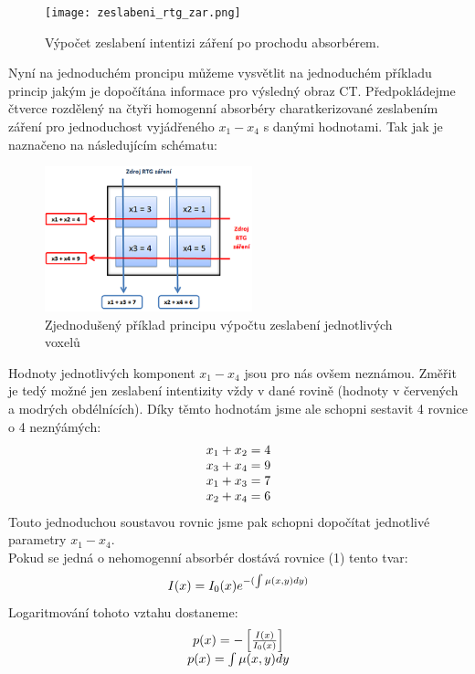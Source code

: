 \documentclass{thesis}%
\begin{document}
\begin{figure}[h!]
 \centering
	\texttt{[image: zeslabeni\_rtg\_zar.png]}
	\caption[Výpočet absorbce]{Výpočet zeslabení intentizi záření po prochodu absorbérem.}
\end{figure}
Nyní na jednoduchém proncipu můžeme vysvětlit na jednoduchém příkladu princip jakým je dopočítána informace pro výsledný obraz CT. Předpokládejme čtverce rozdělený na čtyři homogenní absorbéry charatkerizované zeslabením záření pro jednoduchost vyjádřeného $x_{1} - x_{4} $ s danými hodnotami. Tak jak je naznačeno na následujícím schématu:
\begin{figure}[h!]
 \centering
	\includegraphics[width=6cm]{princip_CT.png}
	\caption[Princip výpočtu zeslabení voxelů]{Zjednodušený příklad principu výpočtu zeslabení jednotlivých voxelů}
\end{figure}
Hodnoty jednotlivých komponent $x_{1} - x_{4}$ jsou pro nás ovšem neznámou. Změřit je tedý možné jen zeslabení intentizity vždy v dané rovině (hodnoty v červených a modrých obdélnících). Díky těmto hodnotám jsme ale schopni sestavit 4 rovnice o 4 neznýámých:
\begin{equation}
 \centering
\begin{array}[h]{c}
	x_{1} + x_{2} = 4 \\
	x_{3} + x_{4} = 9 \\
	x_{1} + x_{3} = 7 \\
	x_{2} + x_{4} = 6
\end{array}
\end{equation}
Touto jednoduchou soustavou rovnic jsme pak schopni dopočítat jednotlivé parametry $x_{1} - x_{4}$. \\
Pokud se jedná o nehomogenní absorbér dostává rovnice (1) tento tvar:
\begin{equation}
 \centering
	I(x) = I_{0}(x)e^{-(\int\mu(x,y) dy) }
\end{equation}
Logaritmování tohoto vztahu dostaneme:
\begin{equation}
 \centering
\begin{array}[h!]{c}
	p(x) = -\left[\frac{I(x)}{I_{0}(x)}\right] \\
	p(x) = \int\mu (x,y) dy
\end{array}
\end{equation}
\end{document}
